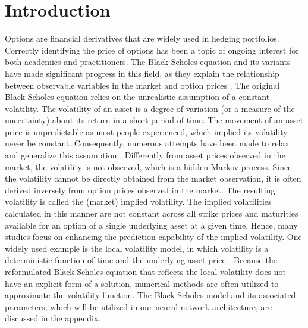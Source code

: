 \documentclass{article}
\begin{document}
\section{Introduction}
Options are financial derivatives that are widely used in hedging portfolios. 
Correctly identifying the price of options has been a topic of ongoing interest for both academics and practitioners. The Black-Scholes equation and its variants have made significant progress in this field, as they explain the relationship between observable variables in the market and option prices \citep{black1972the, black1973the, merton1973theory, garman1983foreign, shinde2012study}. 
The original Black-Scholes equation relies on the unrealistic assumption of a constant volatility.
The volatility of an asset is a degree of variation (or a measure of the uncertainty) about its return in a short period of time. 
The movement of an asset price is unpredictable as most people experienced, which implied its volatility never be constant.
Consequently, numerous attempts have been made to relax and generalize this assumption \citep{hull1987thepricing, heston1993aclosed, derman1994riding, CD02, JT05}.
Differently from asset prices observed in the market, the volatility is not observed, which is a hidden Markov process. Since the volatility cannot be directly obtained from the market observation, it is often derived inversely from option prices observed in the market. The resulting volatility is called the (market) implied volatility.
The implied volatilities calculated in this manner are not constant across all strike prices and maturities available for an option of a single underlying asset at a given time. 
Hence, many studies focus on enhancing the prediction capability of the implied volatility.
One widely used example is the local volatility model, in which volatility is a deterministic function of time and the underlying asset price \citep{derman1994riding, dupire1994pricing}. 
Because the reformulated Black-Scholes equation that reflects the local volatility does not have an explicit form of a solution, numerical methods are often utilized to approximate the volatility function.
{The Black-Scholes model and its associated parameters, which will be utilized in our neural network architecture, are discussed in the appendix.}
\end{document}

